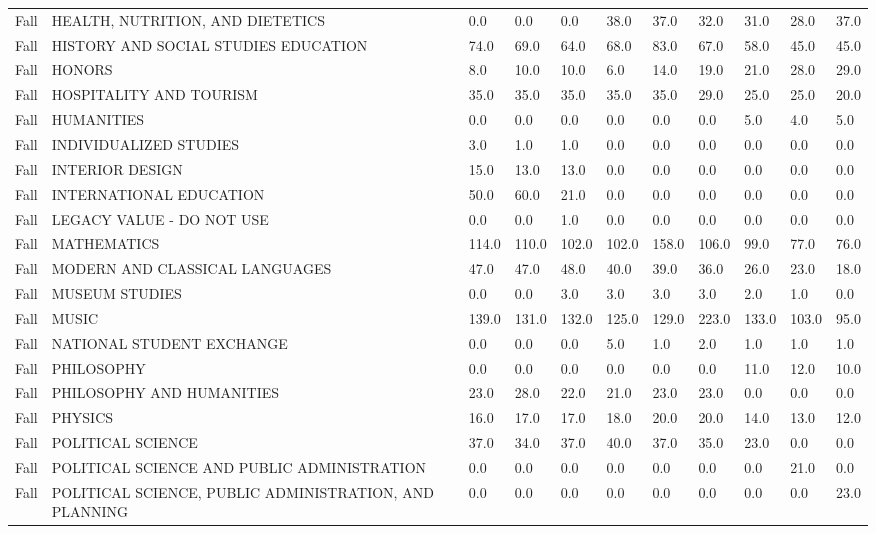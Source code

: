 \documentclass{article}
\begin{document}
\begin{longtable}[]{|l|p{4cm}|p{0.8cm}|p{0.8cm}|p{0.8cm}|p{0.8cm}|p{0.8cm}|p{0.8cm}|p{0.8cm}|p{0.8cm}|p{0.8cm}|}
Fall & HEALTH, NUTRITION, AND DIETETICS & 0.0 & 0.0 & 0.0 & 38.0 & 37.0
& 32.0 & 31.0 & 28.0 & 37.0 \\
Fall & HISTORY AND SOCIAL STUDIES EDUCATION & 74.0 & 69.0 & 64.0 & 68.0
& 83.0 & 67.0 & 58.0 & 45.0 & 45.0 \\
Fall & HONORS & 8.0 & 10.0 & 10.0 & 6.0 & 14.0 & 19.0 & 21.0 & 28.0 &
29.0 \\
Fall & HOSPITALITY AND TOURISM & 35.0 & 35.0 & 35.0 & 35.0 & 35.0 & 29.0
& 25.0 & 25.0 & 20.0 \\
Fall & HUMANITIES & 0.0 & 0.0 & 0.0 & 0.0 & 0.0 & 0.0 & 5.0 & 4.0 &
5.0 \\
Fall & INDIVIDUALIZED STUDIES & 3.0 & 1.0 & 1.0 & 0.0 & 0.0 & 0.0 & 0.0
& 0.0 & 0.0 \\
Fall & INTERIOR DESIGN & 15.0 & 13.0 & 13.0 & 0.0 & 0.0 & 0.0 & 0.0 &
0.0 & 0.0 \\
Fall & INTERNATIONAL EDUCATION & 50.0 & 60.0 & 21.0 & 0.0 & 0.0 & 0.0 &
0.0 & 0.0 & 0.0 \\
Fall & LEGACY VALUE - DO NOT USE & 0.0 & 0.0 & 1.0 & 0.0 & 0.0 & 0.0 &
0.0 & 0.0 & 0.0 \\
Fall & MATHEMATICS & 114.0 & 110.0 & 102.0 & 102.0 & 158.0 & 106.0 &
99.0 & 77.0 & 76.0 \\
Fall & MODERN AND CLASSICAL LANGUAGES & 47.0 & 47.0 & 48.0 & 40.0 & 39.0
& 36.0 & 26.0 & 23.0 & 18.0 \\
Fall & MUSEUM STUDIES & 0.0 & 0.0 & 3.0 & 3.0 & 3.0 & 3.0 & 2.0 & 1.0 &
0.0 \\
Fall & MUSIC & 139.0 & 131.0 & 132.0 & 125.0 & 129.0 & 223.0 & 133.0 &
103.0 & 95.0 \\
Fall & NATIONAL STUDENT EXCHANGE & 0.0 & 0.0 & 0.0 & 5.0 & 1.0 & 2.0 &
1.0 & 1.0 & 1.0 \\
Fall & PHILOSOPHY & 0.0 & 0.0 & 0.0 & 0.0 & 0.0 & 0.0 & 11.0 & 12.0 &
10.0 \\
Fall & PHILOSOPHY AND HUMANITIES & 23.0 & 28.0 & 22.0 & 21.0 & 23.0 &
23.0 & 0.0 & 0.0 & 0.0 \\
Fall & PHYSICS & 16.0 & 17.0 & 17.0 & 18.0 & 20.0 & 20.0 & 14.0 & 13.0 &
12.0 \\
Fall & POLITICAL SCIENCE & 37.0 & 34.0 & 37.0 & 40.0 & 37.0 & 35.0 &
23.0 & 0.0 & 0.0 \\
Fall & POLITICAL SCIENCE AND PUBLIC ADMINISTRATION & 0.0 & 0.0 & 0.0 &
0.0 & 0.0 & 0.0 & 0.0 & 21.0 & 0.0 \\
Fall & POLITICAL SCIENCE, PUBLIC ADMINISTRATION, AND PLANNING & 0.0 &
0.0 & 0.0 & 0.0 & 0.0 & 0.0 & 0.0 & 0.0 & 23.0 \\

\end{longtable}
\end{document}
